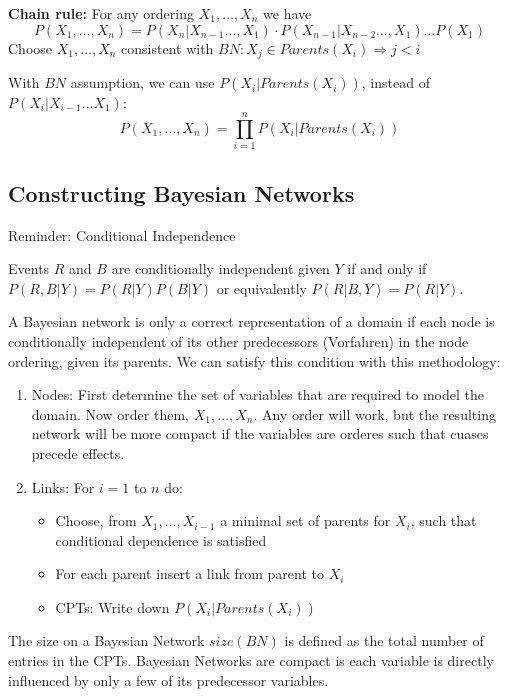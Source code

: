 \documentclass{scrartcl}
\begin{document}
\textbf{Chain rule:} For any ordering \(X_1, \dots, X_n\) we have
\[P(X_1, \dots, X_n) = P(X_n | X_{n-1} \dots, X_1) \cdot P(X_{n-1} | X_{n-2} \dots, X_1) \dots P(X_1)\]
Choose \(X_1, \dots, X_n\) consistent with \(BN: X_j \in Parents(X_i) \Rightarrow j<i\) 

With \(BN\) assumption, we can use \(P(X_i|Parents(X_i))\), instead of \(P(X_i| X_{i-1} \dots X_1)\):
\[P(X_1, \dots, X_n) = \prod_{i=1}^n P(X_i | Parents(X_i))\]

\subsection{Constructing Bayesian Networks}
Reminder: Conditional Independence 

Events \(R\) and \(B\) are conditionally independent given \(Y\) if and only if \(P(R, B | Y) = P(R|Y)P(B|Y)\) or equivalently \(P(R|B,Y) = P(R|Y)\).

\bigbreak

A Bayesian network is only a correct representation of a domain if each node is conditionally independent of its other predecessors (Vorfahren) in the node ordering, given its parents. We can satisfy this condition with this methodology:
\begin{enumerate}
    \item
        Nodes: First determine the set of variables that are required to model the domain. Now order them, \(X_1, \dots, X_n\). Any order will work, but the resulting network will be more compact if the variables are orderes such that cuases precede effects. 
    \item
        Links: For \(i=1\) to \(n\) do:
        \begin{itemize}
            \item
                Choose, from \(X_1, \dots, X_{i-1}\) a minimal set of parents for \(X_i\), such that conditional dependence is satisfied
            \item
                For each parent insert a link from parent to \(X_i\) 
            \item
                CPTs: Write down \(P(X_i|Parents(X_i))\) 
        \end{itemize}
\end{enumerate}

\bigbreak

The size on a Bayesian Network \(size(BN)\) is defined as the total number of entries in the CPTs. Bayesian Networks are compact is each variable is directly influenced by only a few of its predecessor variables.
\end{document}
